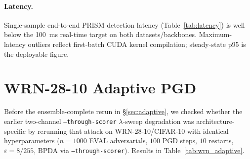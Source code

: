 \paragraph{Latency.}
Single-sample end-to-end PRISM detection latency
(Table~\ref{tab:latency}) is well below the 100~ms real-time target
on both datasets/backbones. Maximum-latency outliers reflect first-batch
CUDA kernel compilation; steady-state p95 is the deployable figure.

\begin{table}[h]
\centering
\small

\caption{End-to-end PRISM detection latency (RTX 4090, $n=200$).}
\label{tab:latency}
\end{table}


\section{WRN-28-10 Adaptive PGD}
\label{app:wrn_adaptive}

Before the ensemble-complete rerun in \S\ref{sec:adaptive}, we checked
whether the earlier two-channel \texttt{--through-scorer}
$\lambda$-sweep degradation was architecture-specific by rerunning that
attack on WRN-28-10/CIFAR-10 with identical hyperparameters
($n{=}1000$ EVAL adversarials, $100$ PGD steps, $10$ restarts,
$\varepsilon{=}8/255$, BPDA via \texttt{--through-scorer}). Results
in Table~\ref{tab:wrn_adaptive}.

